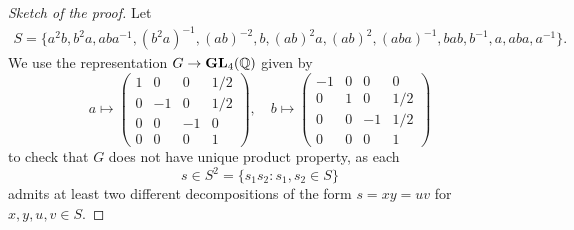 \begin{graybox}
\begin{proof}[Sketch of the proof]
    Let 
    \begin{multline}
    \label{eq:Promislow}
    S=\{ a^2b,
    b^2a,
    aba^{-1},
    (b^2a)^{-1},
    (ab)^{-2},
    b,
    (ab)^2a,
    (ab)^2,
    (aba)^{-1},
    bab,
    b^{-1},
    a,
    aba,
    a^{-1}
    \}.
    \end{multline}
    We use the representation $G\to\mathbf{GL}_4(\mathbb{Q})$ given by 
    \[
a\mapsto\begin{pmatrix}
1 & 0 & 0 & 1/2\\
0 & -1 & 0 & 1/2\\
0 & 0 & -1 & 0\\
0 & 0 & 0 & 1
\end{pmatrix},
\quad
b\mapsto\begin{pmatrix}
-1 & 0 & 0 & 0\\
0 & 1 & 0 & 1/2\\
0 & 0 & -1 & 1/2\\
0 & 0 & 0 & 1
\end{pmatrix}
\]
    to check that 
    $G$ does not have
    unique product property, as each 
    \[
    s\in S^2=\{s_1s_2:s_1,s_2\in S\}
    \]
    admits at least two different decompositions of the 
    form $s=xy=uv$ for $x,y,u,v\in S$. 
\end{proof}


\end{graybox}
